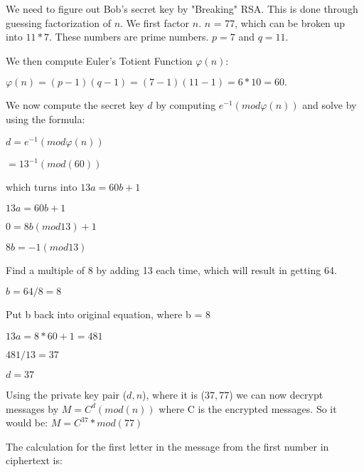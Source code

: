 \documentclass{article}
\begin{document}
\begin{solution}
We need to figure out Bob's secret key by "Breaking" RSA. This is done through guessing factorization of $n$. We first factor $n$. $n$ = 77, which can be broken up into $11 * 7$. These numbers are prime numbers. $p=7$ and $q = 11$.
\newline

We then compute Euler's Totient Function $φ(n)$:
\newline

$φ(n) = (p-1)(q-1) = (7-1)(11-1) = 6*10 = 60.$
\newline

We now compute the secret key $d$ by computing $e^{-1}(modφ(n))$ and solve by using the formula:
\newline

$d = e^{-1} (modφ(n))$

$= 13^{-1} (mod(60)) $
\newline

which turns into $13a = 60b + 1$
\newline

$13a = 60b + 1$
\newline

$0 = 8b (mod 13) + 1 $
\newline

$8b = -1 (mod 13) $
\newline

Find a multiple of 8 by adding 13 each time, which will result in getting 64.
\newline

$b = 64 / 8 = 8 $
\newline

Put b back into original equation, where b = 8
\newline

$13 a = 8 * 60 + 1 = 481$
\newline

$481 / 13 = 37 $
\newline

$d = 37$
\newline

Using the private key pair ($d, n$), where it is ($37, 77$) we can now decrypt messages by $M = C^{d} (mod(n))$ where C is the encrypted messages. So it would be: $M = C^{37} * mod(77)$
\newline

The calculation for the first letter in the message from the first number in ciphertext is:


\end{solution}
\end{document}
